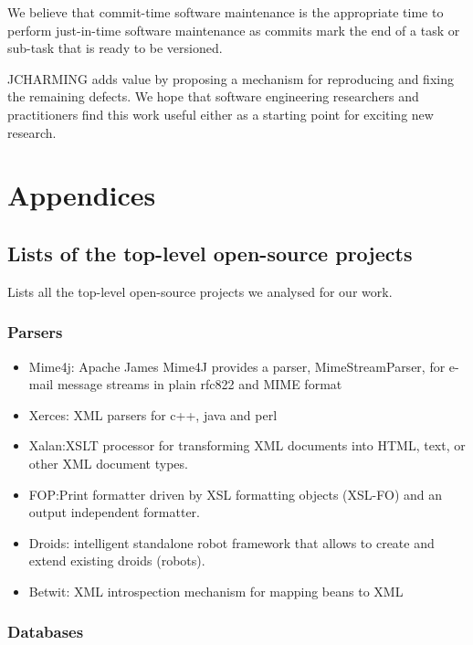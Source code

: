 \documentclass[12pt]{report}
\providecommand{\tightlist}{%
  \setlength{\itemsep}{0pt}\setlength{\parskip}{0pt}}
\begin{document}
We believe that commit-time software maintenance is the appropriate time
to perform just-in-time software maintenance as commits mark the end of
a task or sub-task that is ready to be versioned.

JCHARMING adds value by proposing a mechanism for reproducing and fixing
the remaining defects. We hope that software engineering researchers and
practitioners find this work useful either as a starting point for
exciting new research.

\chapter{Appendices}\label{appendices}

\section{Lists of the top-level open-source
projects}\label{lists-of-the-top-level-open-source-projects}

Lists all the top-level open-source projects we analysed for our work.

\subsection{Parsers}\label{parsers}

\begin{itemize}
\tightlist
\item
  Mime4j: Apache James Mime4J provides a parser, MimeStreamParser, for
  e-mail message streams in plain rfc822 and MIME format
\item
  Xerces: XML parsers for c++, java and perl
\item
  Xalan:XSLT processor for transforming XML documents into HTML, text,
  or other XML document types.
\item
  FOP:Print formatter driven by XSL formatting objects (XSL-FO) and an
  output independent formatter.
\item
  Droids: intelligent standalone robot framework that allows to create
  and extend existing droids (robots).
\item
  Betwit: XML introspection mechanism for mapping beans to XML
\end{itemize}

\subsection{Databases}\label{databases}
\end{document}
